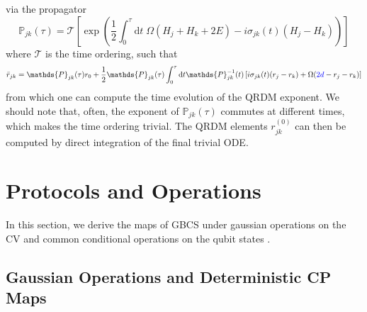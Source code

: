 \documentclass[%
reprint,
superscriptaddress,
nofootinbib,
 amsmath,amssymb,
prx,
floatfix,
]{revtex4-2}
\begin{document}
via the propagator 
\begin{equation}
\label{eq:propagator_r_off}
    \mathds{P}_{jk}(\tau) = \mathcal{T} \left[ \exp \left(\frac{1}{2} \int_{0}^{\tau} \text{d} t \;  \Omega ( H_j + H_k +2 E)  - i   \sigma_{jk}(t) (H_j - H_k) \right)  \right] 
\end{equation}
where $ \mathcal{T}$ is the time ordering, such that
\begin{equation}
    \bar{r}_{jk} = \mathds{P}_{jk}(\tau) r_0 + \frac{1}{2} \mathds{P}_{jk}(\tau) \int_{0}^{\tau} \text{d} t \mathds{P}^{-1}_{jk}(t)  \left[ i  \sigma_{jk} (t) (r_j - r_k) + \Omega (\textcolor{blue}{2d } - r_j - r_k) \right]
\end{equation}
from which one can compute the time evolution of the QRDM exponent. We should note that, often, the exponent of $\mathds{P}_{jk}(\tau) $ commutes at different times, which makes the time ordering trivial. The QRDM elements $r^{(0)}_{jk}$ can then be computed by direct integration of the final trivial ODE.


\section{Protocols and Operations \label{app:operation}}

In this section, we derive the maps of GBCS under gaussian operations on the CV and common conditional operations on the qubit states . 

\subsection{Gaussian Operations and Deterministic CP Maps}
\end{document}
